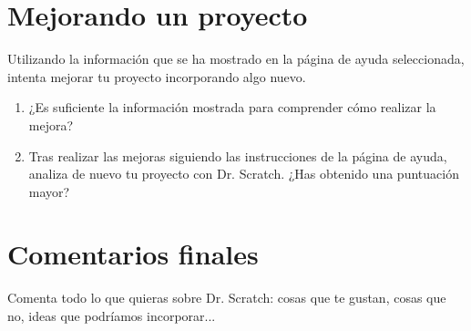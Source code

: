 \documentclass{article}
\begin{document}
\section{Mejorando un proyecto}
Utilizando la información que se ha mostrado en la página de ayuda seleccionada, intenta mejorar tu proyecto incorporando algo nuevo. 
\begin{enumerate}
  \item ¿Es suficiente la información mostrada para comprender cómo realizar la mejora?
  \item Tras realizar las mejoras siguiendo las instrucciones de la página de ayuda, analiza de nuevo tu proyecto con Dr. Scratch. ¿Has obtenido una puntuación mayor?
\end{enumerate}

\section{Comentarios finales}
Comenta todo lo que quieras sobre Dr. Scratch: cosas que te gustan, cosas que no, ideas que podríamos incorporar...
\end{document}
